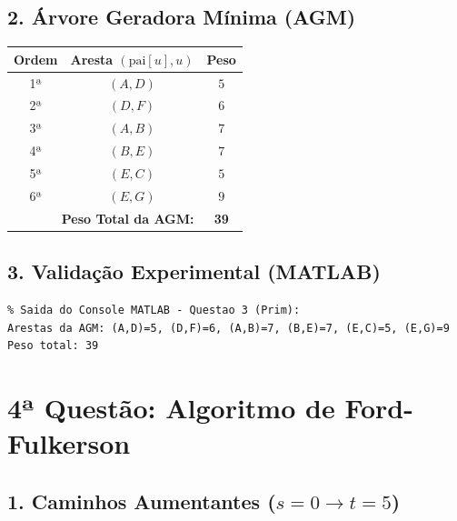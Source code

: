 \documentclass[11pt, a4paper]{article}
\begin{document}
\subsection*{2. Árvore Geradora Mínima (AGM)}

\begin{center}
\begin{tabular}{ccc}
\toprule
\textbf{Ordem} & \textbf{Aresta $(\text{pai}[u], u)$} & \textbf{Peso} \\
\midrule
1ª & $(A, D)$ & $5$ \\
2ª & $(D, F)$ & $6$ \\
3ª & $(A, B)$ & $7$ \\
4ª & $(B, E)$ & $7$ \\
5ª & $(E, C)$ & $5$ \\
6ª & $(E, G)$ & $9$ \\
\midrule
\multicolumn{2}{r}{\textbf{Peso Total da AGM:}} & \textbf{39} \\
\bottomrule
\end{tabular}
\end{center}

\subsection*{3. Validação Experimental (MATLAB)}
\begin{lstlisting}
% Saida do Console MATLAB - Questao 3 (Prim):
Arestas da AGM: (A,D)=5, (D,F)=6, (A,B)=7, (B,E)=7, (E,C)=5, (E,G)=9
Peso total: 39
\end{lstlisting}

\vspace{0.2cm}

\section*{4ª Questão: Algoritmo de Ford-Fulkerson}

\subsection*{1. Caminhos Aumentantes ($s = 0 \to t = 5$)}
\end{document}
